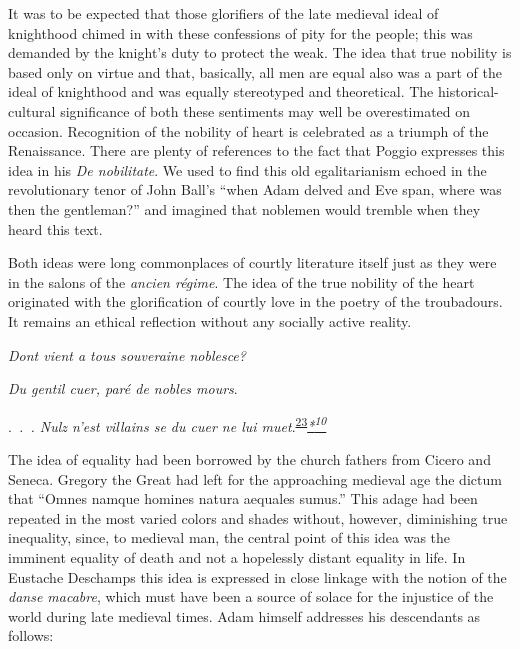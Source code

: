 It was to be expected that those glorifiers of the late medieval ideal
of knighthood chimed in with these confessions of pity for the people;
this was demanded by the knight's duty to protect the weak. The idea
that true nobility is based only on virtue and that, basically, all men
are equal also was a part of the ideal of
knight\protect\hypertarget{10_Chapter_Three__THE_HEROIC_DREAM.xhtmlux5cux23page_68}{}{}hood
and was equally stereotyped and theoretical. The historical-cultural
significance of both these sentiments may well be overestimated on
occasion. Recognition of the nobility of heart is celebrated as a
triumph of the Renaissance. There are plenty of references to the fact
that Poggio expresses this idea in his \emph{De nobilitate}. We used to
find this old egalitarianism echoed in the revolutionary tenor of John
Ball's ``when Adam delved and Eve span, where was then the gentleman?''
and imagined that noblemen would tremble when they heard this text.

Both ideas were long commonplaces of courtly literature itself just as
they were in the salons of the \emph{ancien régime}. The idea of the
true nobility of the heart originated with the glorification of courtly
love in the poetry of the troubadours. It remains an ethical reflection
without any socially active reality.

\emph{Dont vient a tous souveraine noblesce?}

\emph{Du gentil cuer, paré de nobles mours}.

.\emph{~.~. Nulz n'est villains se du cuer ne lui
muet}.\textsuperscript{\protect\hypertarget{10_Chapter_Three__THE_HEROIC_DREAM.xhtmlux5cux23id_1886}{\protect\hyperlink{23_NOTES.xhtmlux5cux23id_1887}{23}}}\emph{\protect\hypertarget{10_Chapter_Three__THE_HEROIC_DREAM.xhtmlux5cux23id_2481}{\protect\hyperlink{23_NOTES.xhtmlux5cux23id_2482}{*\textsuperscript{10}}}}

The idea of equality had been borrowed by the church fathers from Cicero
and Seneca. Gregory the Great had left for the approaching medieval age
the dictum that ``Omnes namque homines natura aequales sumus.'' This
adage had been repeated in the most varied colors and shades without,
however, diminishing true inequality, since, to medieval man, the
central point of this idea was the imminent equality of death and not a
hopelessly distant equality in life. In Eustache Deschamps this idea is
expressed in close linkage with the notion of the \emph{danse macabre},
which must have been a source of solace for the injustice of the world
during late medieval times. Adam himself addresses his descendants as
follows:

